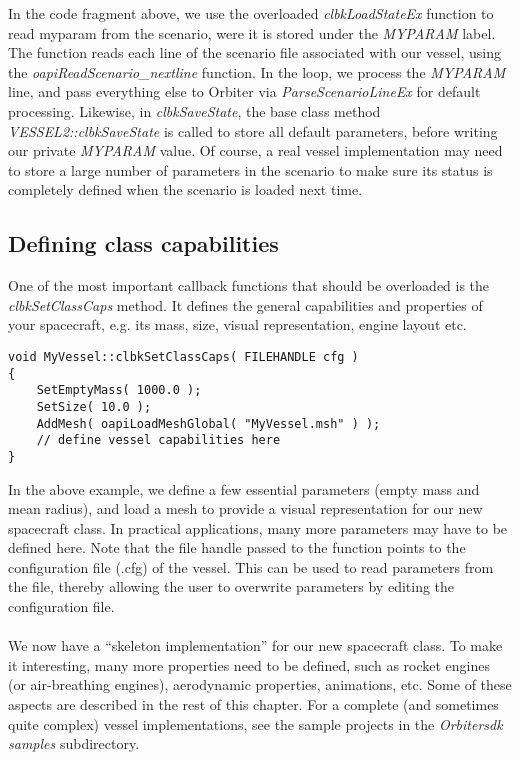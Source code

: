\documentclass[Orbiter Developer Manual.tex]{subfiles}
\begin{document}
\noindent
In the code fragment above, we use the overloaded \textit{clbkLoadStateEx} function to read myparam from the scenario, were it is stored under the \textit{MYPARAM} label. The function reads each line of the scenario file associated with our vessel, using the \textit{oapiReadScenario\_nextline} function. In the loop, we process the \textit{MYPARAM} line, and pass everything else to Orbiter via \textit{ParseScenarioLineEx} for default processing. Likewise, in \textit{clbkSaveState}, the base class method \textit{VESSEL2::clbkSaveState} is called to store all default parameters, before writing our private \textit{MYPARAM} value. Of course, a real vessel implementation may need to store a large number of parameters in the scenario to make sure its status is completely defined when the scenario is loaded next time.


\subsection{Defining class capabilities}
One of the most important callback functions that should be overloaded is the \textit{clbkSetClassCaps} method. It defines the general capabilities and properties of your spacecraft, e.g. its mass, size, visual representation, engine layout etc.

\begin{lstlisting}
void MyVessel::clbkSetClassCaps( FILEHANDLE cfg )
{
	SetEmptyMass( 1000.0 );
	SetSize( 10.0 );
	AddMesh( oapiLoadMeshGlobal( "MyVessel.msh" ) );
	// define vessel capabilities here
}
\end{lstlisting}

\noindent
In the above example, we define a few essential parameters (empty mass and mean radius), and load a mesh to provide a visual representation for our new spacecraft class. In practical applications, many more parameters may have to be defined here. Note that the file handle passed to the function points to the configuration file (.cfg) of the vessel. This can be used to read parameters from the file, thereby allowing the user to overwrite parameters by editing the configuration file.\\
\\
We now have a “skeleton implementation” for our new spacecraft class. To make it interesting, many more properties need to be defined, such as rocket engines (or air-breathing engines), aerodynamic properties, animations, etc. Some of these aspects are described in the rest of this chapter. For a com­plete (and sometimes quite complex) vessel implementations, see the sample projects in the \textit{Orbitersdk\\samples} subdirectory.
\end{document}
